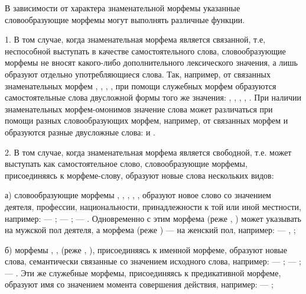 В зависимости от характера знаменательной морфемы указанные словообразующие морфемы могут выполнять различные функции.

1. В том случае, когда знаменательная морфема является связанной, т.е, неспособной выступать в качестве самостоятельного слова, словообразующие морфемы не
вносят какого-либо дополнительного лексического значения, а лишь образуют отдельно употребляющиеся слова. Так, например, от связанных знаменательных морфем , , , ,  при помощи служебных морфем образуются самостоятельные слова двусложной формы того же значения: , , , , . При наличии знаменательных морфем-омонимов значение слова может различаться при помощи разных словообразующих морфем, например, от связанных морфем  и  образуются разные двусложные слова:  и .

2. В том случае, когда знаменательная морфема является свободной, т.е. может выступать как самостоятельное слово, словообразующие морфемы, присоединяясь к морфеме-слову, образуют новые слова нескольких видов:

а) словообразующие морфемы , , , , ,  образуют новое слово со значением деятеля, профессии, национальности, принадлежности к той или иной местности, например:
 --- ;
 --- ;
 --- .
Одновременно с этим морфема  (реже , ) может указывать на мужской пол деятеля, а морфема  (реже ) --- на женский пол, например:
 ---
, ;

б) морфемы	, ,  (реже , ), присоединяясь к именной морфеме, образуют новые слова, семантически связанные со значением исходного слова, например:
 --- ;
 --- ;
 --- .
Эти же служебные морфемы, присоединяясь к предикативной морфеме, образуют имя со значением момента совершения действия, например:  --- ;

